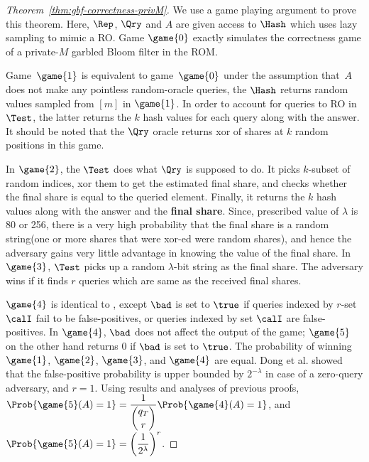 \begin{proof}[Theorem~\ref{thm:gbf-correctness-privM}]
We use a game playing argument to prove this theorem. Here, $\Rep$, $\Qry$ and $A$ are given access to $\Hash$ which uses lazy sampling to mimic a RO. Game $\game{0}$ exactly simulates the correctness game of a private-$M$ garbled Bloom filter in the ROM. 

Game~$\game{1}$ is equivalent to game~$\game{0}$ under the assumption that~$A$ does not make any pointless random-oracle queries, the $\Hash$ returns random values sampled from $[m]$ in $\game{1}$. In order to account for queries to RO in $\Test$, the latter returns the $k$ hash values for each query along with the answer. It should be noted that the $\Qry$ oracle returns xor of shares at $k$ random positions in this game. 

In $\game{2}$, the $\Test$ does what $\Qry$ is supposed to do. It picks $k$-subset of random indices, xor them to get the estimated final share, and checks whether the final share is equal to the queried element. Finally, it returns the $k$ hash values along with the answer and the \textbf{final share}. Since, prescribed value of $\lambda$ is 80 or 256, there is a very high probability that the final share is a random string(one or more shares that were xor-ed were random shares), and hence the adversary gains very little advantage in knowing the value of the final share. In $\game{3}$, $\Test$ picks up a random $\lambda$-bit string as the final share. The adversary wins if it finds $r$ queries which are same as the received final shares.

$\game{4}$ is identical to , except $\bad$ is set to $\true$ if queries indexed by $r$-set $\calI$ fail to be false-positives, or queries indexed by set $\calI$ are false-positives. In $\game{4}$, $\bad$ does not affect the output of the game; $\game{5}$ on the other hand returns 0 if $\bad$ is set to $\true$. The probability of winning $\game{1}$, $\game{2}$, $\game{3}$, and $\game{4}$ are equal. Dong et al. \cite{Dong} showed that the false-positive probability is upper bounded by $2^{-\lambda}$ in case of a zero-query adversary, and $r=1$.  Using results and analyses of previous proofs, $\Prob{\game{5}(A)=1} = \dfrac{1}{\dbinom{q_T}{r}}\Prob{\game{4}(A)=1}$, and $\Prob{\game{5}(A) = 1} = \left( \dfrac{1}{2^{\lambda}} \right)^r$.



\end{proof}
